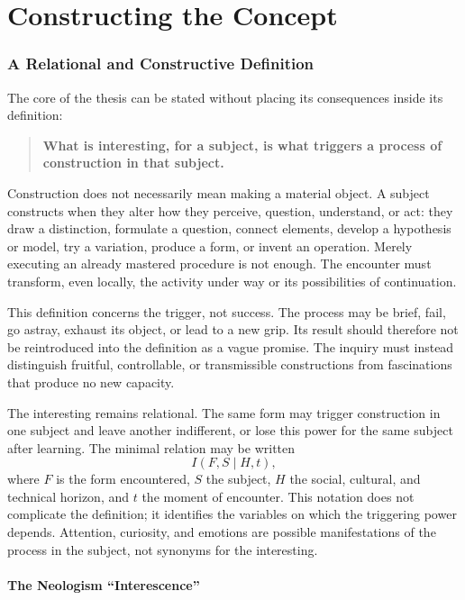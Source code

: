 \documentclass[11pt,a4paper]{article}
\begin{document}
\part{Constructing the Concept}

\section{A Relational and Constructive Definition}

The core of the thesis can be stated without placing its consequences inside
its definition:

\begin{quote}
\textbf{What is interesting, for a subject, is what triggers a process of
construction in that subject.}
\end{quote}

Construction does not necessarily mean making a material object. A subject
constructs when they alter how they perceive, question, understand, or act:
they draw a distinction, formulate a question, connect elements, develop a
hypothesis or model, try a variation, produce a form, or invent an operation.
Merely executing an already mastered procedure is not enough. The encounter
must transform, even locally, the activity under way or its possibilities of
continuation.

This definition concerns the trigger, not success. The process may be brief,
fail, go astray, exhaust its object, or lead to a new grip. Its result should
therefore not be reintroduced into the definition as a vague promise. The
inquiry must instead distinguish fruitful, controllable, or transmissible
constructions from fascinations that produce no new capacity.

The interesting remains relational. The same form may trigger construction in
one subject and leave another indifferent, or lose this power for the same
subject after learning. The minimal relation may be written
\[
  I(F,S\mid H,t),
\]
where \(F\) is the form encountered, \(S\) the subject, \(H\) the social,
cultural, and technical horizon, and \(t\) the moment of encounter. This
notation does not complicate the definition; it identifies the variables on
which the triggering power depends. Attention, curiosity, and emotions are
possible manifestations of the process in the subject, not synonyms for the
interesting.

\subsection{The Neologism ``Interescence''}
\end{document}
